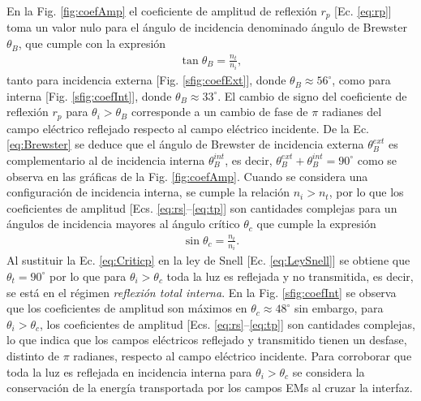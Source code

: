 En la Fig. \ref{fig:coefAmp} el coeficiente de amplitud de reflexión $r_p$ [Ec. \eqref{eq:rp}] toma un valor nulo para el ángulo de incidencia  denominado ángulo de Brewster $\theta_B$, que cumple con la expresión 
%
	\begin{align}
	\tan\theta_B = \frac{n_t}{n_i},
	\label{eq:Brewster}
	\end{align}
%	
tanto para incidencia externa [Fig. \ref{sfig:coefExt}], donde $\theta_B \approx 56^\circ$, como para interna [Fig. \ref{sfig:coefInt}], donde $\theta_B \approx 33^\circ$. El cambio de signo del coeficiente de reflexión $r_p$ para $\theta_i>\theta_B$ corresponde a un cambio de fase de $\pi$ radianes del campo eléctrico reflejado respecto al campo eléctrico incidente. De la Ec. \eqref{eq:Brewster} se deduce que el ángulo de Brewster de incidencia externa $\theta_B^{ext}$ es complementario al de incidencia interna $\theta_B^{int}$, es decir, $\theta_B^{ext}+\theta_B^{int} = 90^\circ$ como se observa en las gráficas de la Fig. \ref{fig:coefAmp}. Cuando se considera una configuración de incidencia interna, se cumple la relación $n_i>n_t$, por lo que los coeficientes de amplitud  [Ecs. \eqref{eq:rs}--\eqref{eq:tp}] son cantidades complejas para un ángulos de incidencia mayores al ángulo crítico $\theta_c$ que cumple la expresión
% 
	\begin{align}
	\sin\theta_c = \frac{n_t}{n_i}.
	\label{eq:Criticp}
	\end{align}
%
Al sustituir la Ec. \eqref{eq:Criticp} en la ley de Snell [Ec. \eqref{eq:LeySnell}] se obtiene que $\theta_t = 90^\circ$ por lo que para $\theta_i>\theta_c$ toda la luz es reflejada y no transmitida, es decir, se está en el régimen \emph{reflexión total interna}. En la Fig. \ref{sfig:coefInt} se observa que los coeficientes de amplitud son máximos en $\theta_c \approx 48^\circ$ sin embargo, para $\theta_i>\theta_c$, los coeficientes de amplitud  [Ecs. \eqref{eq:rs}--\eqref{eq:tp}] son cantidades complejas, lo que indica que los campos eléctricos reflejado y transmitido tienen un desfase, distinto de $\pi$ radianes, respecto al campo eléctrico incidente.  Para corroborar que toda la luz es reflejada en incidencia interna para $\theta_i>\theta_c$ se considera la conservación de la energía transportada por los campos EMs al cruzar la interfaz.

